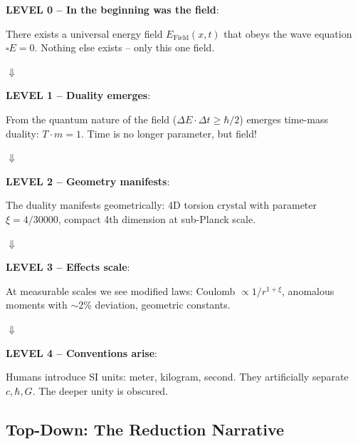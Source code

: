 	\begin{revolutionary}
		\textbf{LEVEL 0 -- In the beginning was the field}:
		
		There exists a universal energy field $E_{\text{Field}}(x,t)$ that obeys the wave equation $\square E = 0$. Nothing else exists -- only this one field.
		
		\vspace{0.3cm}
		
		$\Downarrow$
		
		\vspace{0.3cm}
		
		\textbf{LEVEL 1 -- Duality emerges}:
		
		From the quantum nature of the field ($\Delta E \cdot \Delta t \geq \hbar/2$) emerges time-mass duality: $T \cdot m = 1$. Time is no longer parameter, but field!
		
		\vspace{0.3cm}
		
		$\Downarrow$
		
		\vspace{0.3cm}
		
		\textbf{LEVEL 2 -- Geometry manifests}:
		
		The duality manifests geometrically: 4D torsion crystal with parameter $\xi = 4/30000$, compact 4th dimension at sub-Planck scale.
		
		\vspace{0.3cm}
		
		$\Downarrow$
		
		\vspace{0.3cm}
		
		\textbf{LEVEL 3 -- Effects scale}:
		
		At measurable scales we see modified laws: Coulomb $\propto 1/r^{1+\xi}$, anomalous moments with $\sim$2\% deviation, geometric constants.
		
		\vspace{0.3cm}
		
		$\Downarrow$
		
		\vspace{0.3cm}
		
		\textbf{LEVEL 4 -- Conventions arise}:
		
		Humans introduce SI units: meter, kilogram, second. They artificially separate $c, \hbar, G$. The deeper unity is obscured.
	\end{revolutionary}
	
	\subsection{Top-Down: The Reduction Narrative}
	
